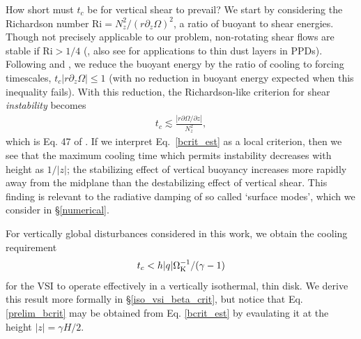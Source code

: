 \documentclass[iop, numberedappendix]{emulateapj}
\newcommand{\p}{\partial}
\def \OmK {\Omega_{\rm K}}
\begin{document}
How short must $t_c$ be for vertical shear to prevail?  We start by 
considering the Richardson number $\mathrm{Ri} = N_z^2/(r\p_z\Omega)^2$, a 
ratio of buoyant to shear energies.  Though not precisely applicable to our problem,
non-rotating shear flows are stable if $\mathrm{Ri} > 1/4$ (\citealp{chandrasekhar61}, 
also see \citealp{ys02, lee10} for applications to thin dust layers in PPDs).
Following \cite{urpin03} and \cite{townsend58},  we reduce the buoyant energy by the 
ratio of cooling to forcing timescales, $t_c |r \p_z\Omega| \leq 1$ (with no reduction in buoyant energy 
expected when this inequality fails).  With this reduction, the Richardson-like criterion for 
shear \emph{instability} becomes
\begin{align}\label{bcrit_est}
  t_c \lesssim \frac{\left|r\p\Omega/\p z\right|} {N_z^2}, 
\end{align}
which is Eq.  47 of \cite{urpin03}. %
If we interpret Eq.\ \ref{bcrit_est} as a local criterion, then we see that 
the maximum cooling time which permits instability decreases with height as $1/|z|$;  
the stabilizing effect of vertical buoyancy increases more rapidly away from
the midplane than the destabilizing effect of vertical shear.  
This finding is relevant to the radiative damping of so called `surface 
modes', which we consider in \S\ref{numerical}.

For vertically global disturbances considered in this work, 
we obtain the cooling requirement 
\begin{align}\label{prelim_bcrit}
  t_c <  h |q| \OmK^{-1}/ (\gamma - 1)
\end{align}   
for the VSI to operate effectively in a vertically isothermal, thin
disk. We derive this result more formally in
\S\ref{iso_vsi_beta_crit}, but notice that Eq. \ref{prelim_bcrit}
may be obtained from Eq. \ref{bcrit_est} by evaulating it at the
height $|z|=\gamma H/2$. %

\end{document}
